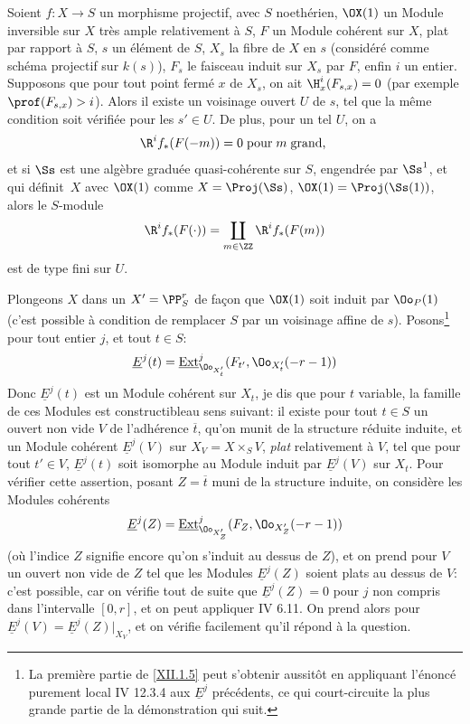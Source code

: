 \begin{proposition} \label{XII.1.5}
Soient $f:X\to S$ un morphisme projectif, avec $S$ noeth\'erien, $\OX(1)$ un Module inversible sur $X$ tr\`es ample relativement \`a $S$, $F$ un Module coh\'erent sur $X$, plat par rapport \`a $S$, $s$ un \'el\'ement de $S$, $X_s$ la fibre de $X$ en $s$ (consid\'er\'e comme sch\'ema projectif sur $k(s)$), $F_s$ le faisceau induit sur $X_s$ par $F$, enfin $i$ un entier. Supposons que pour tout point ferm\'e $x$ de $X_s$, on ait $\H^i_x(F_{s, x})=0$ (par exemple $\prof(F_{s, x})>i$). Alors il existe un voisinage ouvert $U$ de $s$, tel que la m\^eme condition soit v\'erifi\'ee pour les $s'\in U$. De plus, pour un tel $U$, on a
\[
\R^if_\ast(F(-m))= 0 \; \text{pour}\; m \; \text{grand, }
\]
et si $\Ss$ est une alg\`ebre gradu\'ee quasi-coh\'erente sur $S$, engendr\'ee par $\Ss^1$, et qui d\'efinit~$X$ avec $\OX(1)$ comme $X=\Proj(\Ss)$, $\OX(1)=\Proj(\Ss(1))$, alors le $S$-module
\[
\R^if_\ast(F(\cdot)) = \coprod_{m\in\ZZ}\R^if_\ast(F(m))
\]
est de type fini sur $U$.
\end{proposition}

Plongeons $X$ dans un $X'=\PP_S^r$ de fa\c con que $\OX(1)$ soit induit par $\Oo_{P}(1)$ (c'est possible \`a condition de remplacer $S$ par un voisinage affine de $s$). Posons\label{P5}\footnote{La premi\`ere partie de \ref{XII.1.5} peut s'obtenir aussit\^{o}t en appliquant l'\'enonc\'e purement local \EGA IV 12.3.4 aux $\underline{E}^j$ pr\'ec\'edents, ce qui court-circuite la plus grande partie de la d\'emonstration qui suit.} pour tout entier $j$, et tout $t\in S$:
\steco
\begin{equation} \label{eq:XII.7} {}\underline{E}^j(t)= \mathop{\underline{\mathrm{Ext}}}\nolimits^j_{\Oo_{X'_t}} (F_{t'}, \Oo_{X'_t}(-r-1))
\end{equation}
Donc $\underline{E}^j(t)$ est un Module coh\'erent sur $X_t$, je dis que pour $t$ variable, la famille de ces Modules est \og constructible\fg au sens suivant: il existe pour tout $t\in S$ un ouvert non vide $V$ de l'adh\'erence $\overline{t}$, qu'on munit de la structure r\'eduite induite, et un Module coh\'erent $\underline{E}^j(V)$ sur $X_V=X\times_SV$, \emph{plat} relativement \`a $V$, tel que pour tout $t'\in V$, $\underline{E}^j(t)$ soit isomorphe au Module induit par $\underline{E}^j(V)$ sur $X_t$. Pour v\'erifier cette assertion, posant $Z=\overline{t}$ muni de la structure induite, on consid\`ere les Modules coh\'erents
\[
\underline{E}^j(Z)= \mathop{\underline{\mathrm{Ext}}}\nolimits^j_{\Oo_{X'_Z}} (F_Z, \Oo_{X'_Z}(-r-1))
\]
(o\`u l'indice $Z$ signifie encore qu'on s'induit au dessus de $Z$), et on prend pour $V$ un ouvert non vide de $Z$ tel que les Modules $\underline{E}^j(Z)$ soient plats au dessus de $V$: c'est possible, car on v\'erifie tout de suite que $\underline{E}^j(Z)=0$ pour $j$ non compris dans l'intervalle $[0, r]$, et on peut appliquer  IV 6.11. On prend alors pour $\underline{E}^j(V)=\underline{E}^j(Z)|_{X_V}$, et on v\'erifie facilement qu'il r\'epond \`a la question.

